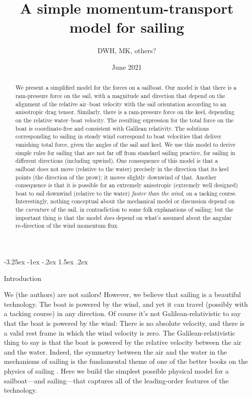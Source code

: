 \documentclass[letterpaper]{article}
\title{\bfseries%
A simple momentum-transport model for sailing}
\author{DWH, MK, others?}
\date{June 2021}
\makeatletter
\renewcommand\section{\@startsection {section}{1}{\z@}%
  {-3.25ex \@plus -1ex \@minus -.2ex}%
  {1.5ex \@plus .2ex}%
  {\raggedright\normalfont\large\bfseries}}
\makeatother
\begin{document}
\maketitle

\begin{abstract}\noindent
    We present a simplified model for the forces on a sailboat.
    Our model is that there is a ram-pressure force on the sail, with a magnitude and direction that depend on the alignment of the relative air--boat velocity with the sail orientation according to an anisotropic drag tensor.
    Similarly, there is a ram-pressure force on the keel, depending on the relative water--boat velocity.
    The resulting expression for the total force on the boat is coordinate-free and consistent with Galilean relativity.
    The solutions corresponding to sailing in steady wind correspond to boat velocities that deliver vanishing total force, given the angles of the sail and keel.
    We use this model to derive simple rules for sailing that are not far off from standard sailing practice, for sailing in different directions (including upwind).
    One consequence of this model is that a sailboat does not move (relative to the water) precisely in the direction that its keel points (the direction of the prow); it moves slightly downwind of that.
    Another consequence is that it is possible for an extremely anisotropic (extremely well designed) boat to sail downwind (relative to the water) \emph{faster than the wind}, on a tacking course.
    Interestingly, nothing conceptual about the mechanical model or discussion depend on the \emph{curvature} of the sail, in contradiction to some folk explanations of sailing; but the important thing is that the model \emph{does} depend on what's assumed about the angular re-direction of the wind momentum flux.
\end{abstract}

\section{Introduction}\label{sec:intro}

We (the authors) are not sailors!
However, we believe that sailing is a beautiful technology.
The boat is powered by the wind, and yet it can travel (possibly with a tacking course) in any direction.
Of course it's not Galilean-relativistic to say that the boat is powered by the wind:
There is no absolute velocity, and there is a valid rest frame in which the wind velocity is zero.
The Galilean-relativistic thing to say is that the boat is powered by the relative velocity between the air and the water.
Indeed, the symmetry between the air and the water in the mechanisms of sailing is the fundamental theme of one of the better books on the physics of sailing \cite{symmetry}.
Here we build the simplest possible physical model for a sailboat---and sailing---that captures all of the leading-order features of the technology.
\end{document}
